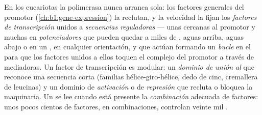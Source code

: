 \begin{definition}\label{def:b1:expression-control:enhancer}
En los eucariotas la polimerasa nunca arranca sola: los factores generales
del promotor (\cref{ch:b1:gene-expression}) la reclutan, y la velocidad la
fijan los \emph{factores de transcripción} unidos a \emph{secuencias
reguladoras} --- unas cercanas al promotor y muchas en
\emph{potenciadores} que pueden quedar a miles de , aguas
arriba, aguas abajo o en un , en cualquier orientación, y que actúan
formando un \emph{bucle} en el  para que los factores unidos a ellos
toquen el complejo del promotor a través de  mediadoras. Un factor
de transcripción es modular: un \emph{dominio de unión al } que reconoce
una secuencia corta (familias hélice-giro-hélice, dedo de cinc, cremallera
de leucinas) y un dominio de \emph{activación} o de \emph{represión} que
recluta o bloquea la maquinaria. Un  se lee cuando está presente la
\emph{combinación} adecuada de factores: unos pocos cientos de factores, en
combinaciones, controlan veinte mil .
\end{definition}

